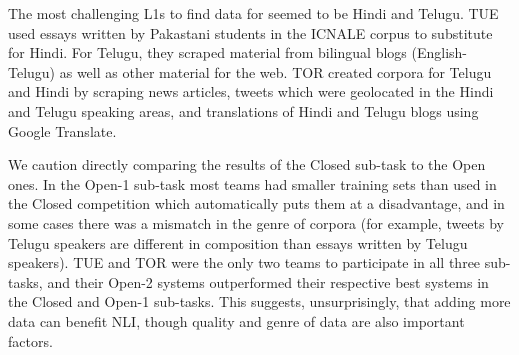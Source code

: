 \documentclass[11pt,letterpaper]{article}
\begin{document}
The most challenging L1s to find data for seemed to be Hindi and Telugu.  TUE used essays written by Pakastani
students in the ICNALE corpus to substitute for Hindi.  For Telugu, they scraped material from bilingual blogs
(English-Telugu) as well as other material for the web.  TOR created corpora for
Telugu and Hindi by scraping news articles, tweets which were geolocated in the
Hindi and Telugu speaking areas, and translations of Hindi and Telugu blogs using
Google Translate.

We caution directly comparing the results of the Closed sub-task to the Open ones.  In the Open-1 sub-task
most teams had smaller training sets than used in the Closed competition which automatically
puts them at a disadvantage, and in some cases there was a mismatch in the genre of corpora (for example, tweets
by Telugu speakers are different in composition than essays written by Telugu speakers).  TUE and TOR
were the only two teams to participate in all three sub-tasks, and their Open-2 systems outperformed
their respective best systems in the Closed and Open-1 sub-tasks.  This suggests, unsurprisingly, that
adding more data can benefit NLI, though quality and genre of data are also important factors.

\end{document}
